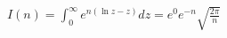 \documentclass[preview]{standalone}
\begin{document}
\begin{align*}
I(n) = \int_0^{\infty}e^{n(\ln z-z)}dz=e^{0} e^{-n} \sqrt{\frac{2\pi}{n}}
\end{align*}
\end{document}
